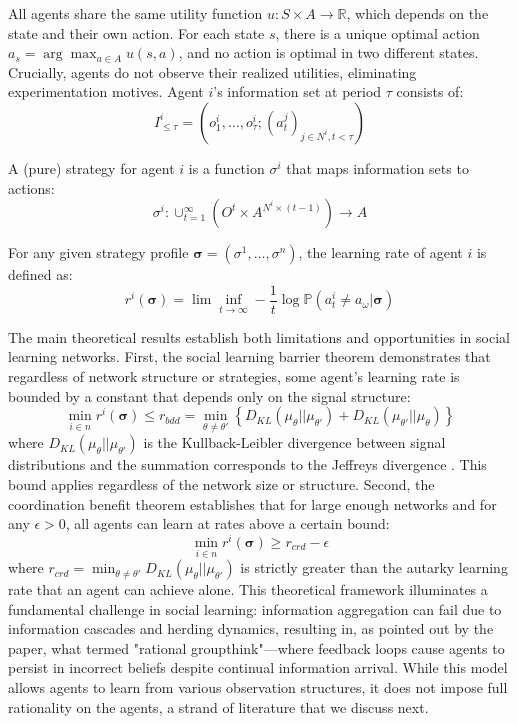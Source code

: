 All agents share the same utility function $u: S \times A \rightarrow \mathbb{R}$, which depends on the state and their own action. For each state $s$, there is a unique optimal action $a_{s} = \arg\max_{a \in A} u(s, a)$, and no action is optimal in two different states. Crucially, agents do not observe their realized utilities, eliminating experimentation motives. Agent $i$'s information set at period $\tau$ consists of:
\begin{equation*}
    I^i_{\leq \tau} = (o^i_1, \ldots, o^i_{\tau}; (a^j_t)_{j \in N^i, t < \tau})
\end{equation*}

A (pure) strategy for agent $i$ is a function $\sigma^i$ that maps information sets to actions:
\begin{equation*}
    \sigma^i: \cup_{t=1}^{\infty} (O^t \times A^{N^i \times (t-1)}) \rightarrow A
\end{equation*}

For any given strategy profile $\boldsymbol{\sigma} = (\sigma^1, \ldots, \sigma^n)$, the learning rate of agent $i$ is defined as:
\begin{equation*}
    r^i(\boldsymbol{\sigma}) = \lim\inf_{t\rightarrow\infty} -\frac{1}{t}\log \mathbb{P}(a^i_t \neq a_{\omega} | \boldsymbol{\sigma})
\end{equation*}

The main theoretical results establish both limitations and opportunities in social learning networks. First, the social learning barrier theorem demonstrates that regardless of network structure or strategies, some agent's learning rate is bounded by a constant that depends only on the signal structure:
\begin{equation*}
    \min_{i \in n} r^i(\boldsymbol{\sigma}) \leq r_{bdd} = \min_{\theta \neq \theta'} \left\{D_{KL}(\mu_{\theta} || \mu_{\theta'}) + D_{KL}(\mu_{\theta'} || \mu_{\theta})\right\}
\end{equation*}
where $D_{KL}(\mu_{\theta} || \mu_{\theta'})$ is the Kullback-Leibler divergence between signal distributions and the summation corresponds to the Jeffreys divergence \citet{52862b84-7c34-3186-8b28-6af4806272c3}. This bound applies regardless of the network size or structure. Second, the coordination benefit theorem establishes that for large enough networks and for any $\epsilon > 0$, all agents can learn at rates above a certain bound:
\begin{equation*}
    \min_{i \in n} r^i(\boldsymbol{\sigma}) \geq r_{crd} - \epsilon
\end{equation*}
where $r_{crd} = \min_{\theta \neq \theta'} D_{KL}(\mu_{\theta} || \mu_{\theta'})$ is strictly greater than the autarky learning rate that an agent can achieve alone. This theoretical framework illuminates a fundamental challenge in social learning: information aggregation can fail due to information cascades and herding dynamics, resulting in, as pointed out by the paper, what \citet{harel2021rational} termed "rational groupthink"—where feedback loops cause agents to persist in incorrect beliefs despite continual information arrival. While this model allows agents to learn from various observation structures, it does not impose full rationality on the agents, a strand of literature that we discuss next.

